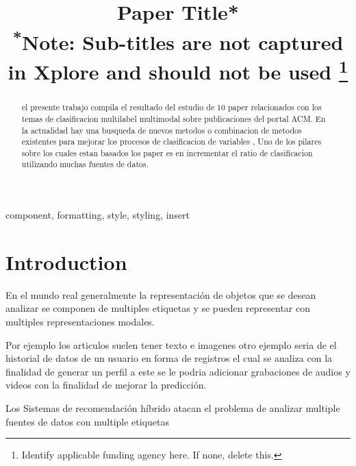 \documentclass[conference]{IEEEtran}
\begin{document}
\title{Paper Title*\\
{\footnotesize \textsuperscript{*}Note: Sub-titles are not captured in Xplore and
should not be used}
\thanks{Identify applicable funding agency here. If none, delete this.}
}

\author{

}

\maketitle

\begin{abstract}
el presente trabajo compila el resultado del estudio de 10 paper relacionados con los temas de clasificacion multilabel multimodal sobre publicaciones del portal ACM.
En la actualidad hay una busqueda de nuevos metodos o combinacion  de metodos existentes para mejorar los procesos de clasificacion de variables ,
Uno de los pilares sobre los cuales estan basados los paper es en incrementar el ratio de clasificacion utilizando muchas fuentes de datos.
\end{abstract}

\begin{IEEEkeywords}
component, formatting, style, styling, insert
\end{IEEEkeywords}

\section{Introduction}
En el mundo real generalmente la representación de objetos que se desean analizar se componen de multiples etiquetas y se pueden representar con multiples representaciones modales.

Por ejemplo los articulos suelen tener texto e imagenes otro ejemplo seria  de  el historial de datos de un usuario en forma de registros el cual se analiza con la finalidad de generar un perfil a este se le podria adicionar grabaciones de audios y videos con la finalidad de mejorar la predicción.

Los Sistemas de recomendación híbrido atacan el problema de analizar multiple fuentes de datos con multiple etiquetas
 
\end{document}
